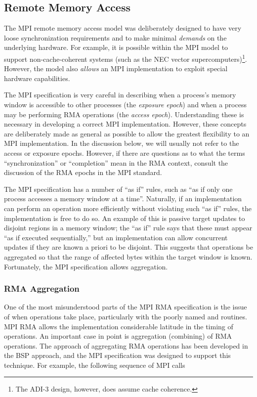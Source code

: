 \subsection{Remote Memory Access}
\label{sec:rma-design}
The MPI remote memory access model was deliberately designed to have
very loose synchronization requirements and to make minimal \emph{demands} on
the 
underlying hardware.  For example, it is possible within the MPI model
to support non-cache-coherent systems (such as the NEC vector
supercomputers)\footnote{The ADI-3 design, however, does assume cache
coherence.}.  However, the model also \emph{allows} an MPI 
implementation to exploit special hardware capabilities.  

%
The MPI specification is very careful in describing when a process's
memory window is accessible to other processes (the \emph{exposure
epoch}) and when a process may be performing RMA operations (the
\emph{access epoch}).  Understanding these is necessary in developing
a correct MPI implementation.  However, these concepts are
deliberately made as general as possible to allow the greatest
flexibility to an MPI implementation.  In the discussion below, we
will usually not refer to the access or exposure epochs.  However, if
there are questions as to what the terms ``synchronization'' or
``completion'' mean in the RMA context, consult the discussion of the
RMA epochs in the MPI standard.

The MPI specification has a number of ``as if'' rules, such as ``as if
only one process accesses a memory window at a time''.  Naturally, if
an implementation can perform an operation more efficiently without
violating such ``as if'' rules, the implementation is free to do so.
An example of this is passive target updates to disjoint regions in a
memory window; 
the ``as if'' rule says that these must appear ``as if executed
sequentially,'' but an implementation can allow concurrent updates if
they are known a priori to be disjoint.  This suggests that operations
be aggregated so that the range of affected bytes within the target
window is known.  Fortunately, the MPI specification allows aggregation.

\subsubsection{RMA Aggregation}
One of the most misunderstood parts of the MPI RMA specification is
the issue of when operations take place, particularly with the poorly
named  and  routines.  MPI RMA
allows the implementation considerable latitude in the timing of
operations.  An important case in point is aggregation (combining) of RMA
operations.  The approach of aggregating RMA operations has been
developed in the BSP approach, and the MPI specification was designed
to support this technique.  For example, the following sequence of MPI
calls

